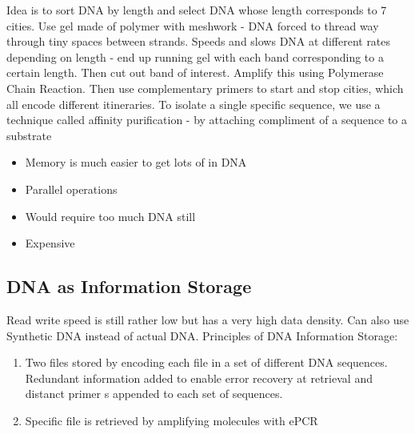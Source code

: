 \documentclass{article}
\newenvironment{pros}{\par\color[rgb]{0.066, 0.4, 0.129}}{\par}
\newenvironment{cons}{\par\color{red}}{\par}
\begin{document}
Idea is to sort DNA by length and select DNA whose length corresponds to 7 cities. Use gel made of polymer with meshwork - DNA forced to thread way through tiny spaces between strands. Speeds and slows DNA at different rates depending on length - end up running gel with each band corresponding to a certain length. Then cut out band of interest. Amplify this using Polymerase Chain Reaction. Then use complementary primers to start and stop cities, which all encode different itineraries. To isolate a single specific sequence, we use a technique called affinity purification - by attaching compliment of a sequence to a substrate

\begin{itemize}
    \begin{pros}
    \item Memory is much easier to get lots of in DNA
    \item Parallel operations
    \end{pros}
    \begin{cons}
    \item Would require too much DNA still
    \item Expensive
    \end{cons}
\end{itemize}

\subsection{DNA as Information Storage}
Read write speed is still rather low but has a very high data density. Can also use Synthetic DNA instead of actual DNA. Principles of DNA Information Storage:
\begin{enumerate}
    \item Two files stored by encoding each file in a set of different DNA sequences. Redundant information added to enable error recovery at retrieval and distanct primer s appended to each set of sequences.
    \item Specific file is retrieved by amplifying molecules with ePCR
\end{enumerate}
\end{document}
